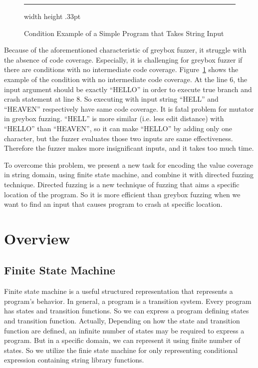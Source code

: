 \documentclass[12pt]{sigplanconf}
\begin{document}
\begin{figure}[h]
    \cFormat
    
    \hrule width \hsize height .33pt
    \caption{Condition Example of a Simple Program that Takes String Input}
    \label{fig:string-example}
  \end{figure}

Because of the aforementioned characteristic of greybox fuzzer, it struggle with the absence of code coverage. Especially,
it is challenging for greybox fuzzer if there are conditions with no intermediate code coverage. Figure~\ref{fig:string-example}
shows the example of the condition with no intermediate code coverage. At the line 6, the input argument should be exactly
``HELLO'' in order to execute true branch and crash statement at line 8. So executing with input string ``HELL'' and
``HEAVEN'' respectively have same code coverage. It is fatal problem for mutator in greybox fuzzing. ``HELL'' is more
similar (i.e. less edit distance) with ``HELLO'' than ``HEAVEN'', so it can make ``HELLO'' by adding only one character,
but the fuzzer evaluates those two inputs are same effectiveness. Therefore the fuzzer makes more insignificant inputs,
and it takes too much time.

To overcome this problem, we present a new task for encoding the value coverage in string domain, using finite state machine,
and combine it with directed fuzzing technique. Directed fuzzing is a new technique of fuzzing that aims a specific location
of the program. So it is more efficient than greybox fuzzing when we want to find an input that causes program to crash
at specific location.

\section{Overview}
\subsection{Finite State Machine}
Finite state machine is a useful structured representation that represents a program's behavior. In general, a program is
a transition system. Every program has states and transition functions. So we can express a program defining states and
transition function. Actually, Depending on how the state and transition function are defined, an infinite number of states
may be required to express a program. But in a specific domain, we can represent it using finite number of states. So we
utilize the finie state machine for only representing conditional expression containing string library functions.
\end{document}
